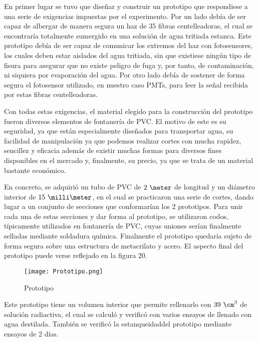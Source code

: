 En primer lugar se tuvo que diseñar y construir un prototipo que respondiese a una serie de exigencias impuestas por el experimento. Por un lado  debía de ser capaz de albergar de manera segura  un haz de 35 fibras centelleadoras, el cual se encontraría totalmente sumergido en una solución de agua tritiada estanca. Este prototipo debía de ser capaz de comunicar los extremos del haz con fotosensores, los cuales deben estar aislados del agua tritiada, sin que existiese ningún tipo de fisura para asegurar que no existe peligro de fuga y, por tanto, de contaminación, ni siquiera por evaporación del agua. Por otro lado debía de sostener de forma segura el fotosensor utilizado, en nuestro caso PMTs, para leer la señal recibida por estas fibras centelleadoras.

Con todas estas exigencias, el material elegido para la construcción del prototipo fueron diversos elementos de fontanería de PVC. El motivo de este es su seguridad, ya que están especialmente diseñados para transportar  agua, su facilidad de manipulación ya que podemos realizar cortes con mucha rapidez, sencillez y eficacia además de existir muchas formas para diversos fines disponibles en el mercado y, finalmente, su precio, ya que se trata de un material bastante económico. 

En concreto, se adquirió un tubo de PVC de $2~\meter$ de longitud y un diámetro interior de $15~\milli\meter$, en el cual se practicaron una serie de cortes, dando lugar a un conjunto de secciones que conformarían los 2 prototipos. Para unir cada una de estas secciones y dar forma al prototipo, se utilizaron codos, típicamente utilizados en fontanería de PVC, cuyas uniones serían finalmente selladas mediante soldadura química. Finalmente el prototipo quedaría sujeto de forma segura sobre una estructura de metacrilato y acero. El aspecto final del prototipo puede verse reflejado en la figura 20.

\begin{figure}[hbtp]
\centering
\texttt{[image: Prototipo.png]}
\caption{ Prototipo\label{prototipo}}
\end{figure}

Este prototipo tiene un volumen interior que permite rellenarlo con   $39~\cm^3$ de solución radiactiva, el cual se calculó y verificó con varios ensayos de llenado con agua destilada. También se verificó la estanqueidaddel prototipo mediante ensayos de 2 días. 

